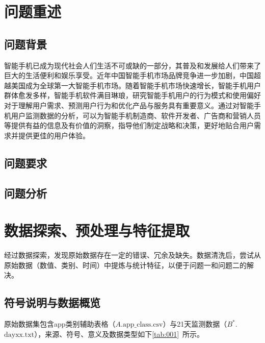 \documentclass[withoutpreface,bwprint]{cumcmthesis}
\begin{document}
\tableofcontents
\newpage

\pagestyle{mainmatterstyle}
\setcounter{page}{1}
\section{问题重述}

\subsection{问题背景}

智能手机已成为现代社会人们生活不可或缺的一部分，其普及和发展给人们带来了巨大的生活便利和娱乐享受。近年中国智能手机市场品牌竞争进一步加剧，中国超越美国成为全球第一大智能手机市场。随着智能手机市场快速增长，智能手机用户群体愈发多样，智能手机软件满目琳琅，研究智能手机用户的行为模式和使用偏好对于理解用户需求、预测用户行为和优化产品与服务具有重要意义。通过对智能手机用户监测数据的分析，可以为智能手机制造商、软件开发者、广告商和营销人员等提供有益的信息及有价值的洞察，指导他们制定战略和决策，更好地贴合用户需求并提供更佳的用户体验。

\subsection{问题要求}

\subsection{问题分析}

\newpage
\section{数据探索、预处理与特征提取}

经过数据探索，发现原始数据存在一定的错误、冗余及缺失。数据清洗后，尝试从原始数据（数值、类别、时间）中提炼与统计特征，以便于问题一和问题二的解决。

\subsection{符号说明与数据概览}

原始数据集包含app类别辅助表格（$A$.$\text{app\_class.csv}$）与21天监测数据（$B^*$.$\text{dayxx.txt}$），来源、符号、意义及数据类型如下\cref{tab:001}~所示。
\end{document}
